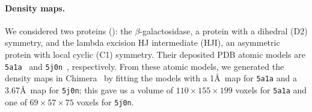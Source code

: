 \paragraph{Density maps.}
We considered two proteins (): the $\beta$-galactosidase, a protein with a dihedral (D2) symmetry, and the lambda excision HJ intermediate (HJI), an asymmetric protein with local cyclic (C1) symmetry.
Their deposited PDB atomic models are \texttt{5a1a}~\cite{bartesaghi2015betagal} and \texttt{5j0n}~\cite{laxmikanthan2016structure}, respectively.
From these atomic models, we generated the density maps in Chimera~\cite{pettersen2004ucsf} by fitting the models with a 1\AA\ map for \texttt{5a1a} and a 3.67\AA\ map for \texttt{5j0n}; this gave us a volume of $110 \times 155 \times 199$ voxels for \texttt{5a1a} and one of $69 \times 57 \times 75$ voxels for \texttt{5j0n}.

